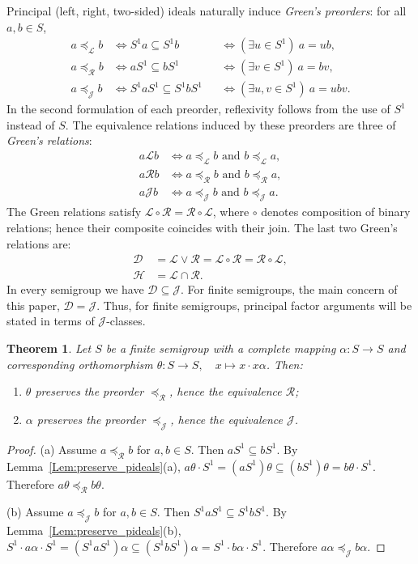 \documentclass[11pt]{article}
\theoremstyle{plain}
\newtheorem{theorem}{Theorem}[section]
\theoremstyle{remark}
\theoremstyle{definition}
\theoremstyle{plain}
\newcommand\gd{\mathcal{D}}
\newcommand\gl{\mathcal{L}}
\newcommand\gr{\mathcal{R}}
\newcommand\gh{\mathcal{H}}
\newcommand\gj{\mathcal{J}}
\newcommand\gll{\mathrel{\gl}}
\newcommand\grr{\mathrel{\gr}}
\newcommand\gjj{\mathrel{\gj}}
\begin{document}
Principal (left, right, two-sided) ideals naturally induce \emph{Green's preorders}: for all $a,b \in S$,
\begin{align*}
a\preceq_{\gl} b &\iff S^1a\subseteq S^1b &&\iff (\exists u\in S^1)\  a=ub, \\
a\preceq_{\gr} b &\iff aS^1\subseteq bS^1 &&\iff (\exists v\in S^1)\ a=bv, \\
a\preceq_{\gj} b &\iff S^1 aS^1\subseteq S^1 bS^1 &&\iff (\exists u,v\in S^1)\  a=ubv.
\end{align*}
In the second formulation of each preorder, reflexivity follows from the use of $S^1$ instead of $S$.
The equivalence relations induced by these preorders are three of \emph{Green's relations}:
\begin{align*}
a\gll b &\iff a\preceq_{\gl} b\text{ and }b\preceq_{\gl} a, \\
a\grr b &\iff a\preceq_{\gr} b\text{ and }b\preceq_{\gr} a, \\
a\gjj b &\iff a\preceq_{\gj} b\text{ and }b\preceq_{\gj} a.
\end{align*}
The Green relations satisfy $\gl\circ \gr = \gr\circ \gl$, where $\circ$ denotes composition of binary relations; hence their composite
coincides with their join. The last two Green's relations are:
\begin{align*}
\gd &= \gl\lor \gr = \gl\circ \gr = \gr\circ \gl, \\
\gh &= \gl\cap \gr.
\end{align*}
In every semigroup we have $\gd\subseteq \gj$. For finite semigroups, the main concern of this paper, $\gd = \gj$.
Thus, for finite semigroups, principal factor arguments will be stated in terms of $\mathcal J$-classes.

\begin{theorem}\label{Thm:green}
Let $S$ be a finite semigroup with a complete mapping $\alpha\colon S\to S$ and corresponding orthomorphism
$\theta\colon S\to S,\quad x\mapsto x\cdot x\alpha$. Then:
\begin{enumerate}
  \item $\theta$ preserves the preorder $\preceq_{\gr}$, hence the equivalence $\mathcal{R}$;
  \item $\alpha$ preserves the preorder $\preceq_{\gj}$, hence the equivalence $\mathcal{J}$.
\end{enumerate}
\end{theorem}
\begin{proof}
(a) Assume $a\preceq_{\gr} b$ for $a,b\in S$. Then $aS^1\subseteq bS^1$. By Lemma~\ref{Lem:preserve_pideals}(a),
\(a\theta\cdot S^1 = (aS^1)\theta\subseteq (bS^1)\theta = b\theta\cdot S^1.\)
Therefore $a\theta\preceq_{\gr} b\theta$.

(b) Assume $a\preceq_{\gj} b$ for $a,b\in S$. Then $S^1 aS^1\subseteq S^1 bS^1$. {By Lemma~\ref{Lem:preserve_pideals}(b),
\(S^1\cdot a\alpha\cdot S^1=(S^1aS^1)\alpha\subseteq(S^1bS^1)\alpha=S^1\cdot b\alpha\cdot S^1.\)
Therefore $a\alpha\preceq_{\gj} b\alpha$.}
\end{proof}
\end{document}
